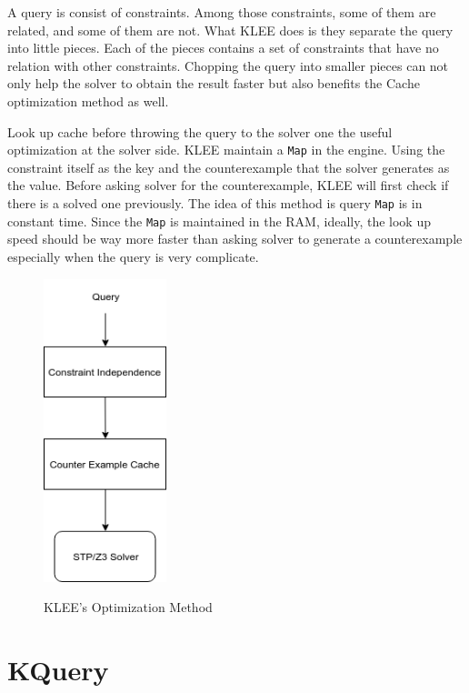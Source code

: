 A query is consist of constraints. Among those constraints, some of them are related, and some of them are not. What KLEE does is they separate the query into little pieces. Each of the pieces contains a set of constraints that have no relation with other constraints. Chopping the query into smaller pieces can not only help the solver to obtain the result faster but also benefits the Cache optimization method as well.

Look up cache before throwing the query to the solver one the useful optimization at the solver side. KLEE maintain a \texttt{Map} in the engine. Using the constraint itself as the key and the counterexample that the solver generates as the value. Before asking solver for the counterexample, KLEE will first check if there is a solved one previously. The idea of this method is query \texttt{Map} is in constant time. Since the \texttt{Map} is maintained in the RAM, ideally, the look up speed should be way more faster than asking solver to generate a counterexample especially when the query is very complicate.

\begin{figure}[h]%
\begin{center}
{\mbox{\includegraphics[height=250pt]{figures/klee_optimization.png}}}
\end{center}
\caption{\label{klee_optimization}KLEE's Optimization Method}
\end{figure}

\section{KQuery}

